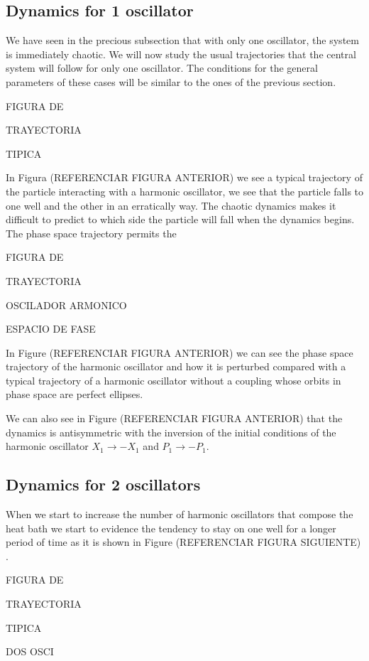 \subsection{Dynamics for 1 oscillator}
We have seen in the precious subsection that with only one oscillator, the system is immediately chaotic. We will now study the usual trajectories that the central system will follow for only one oscillator. The conditions for the general parameters of these cases will be similar to the ones of the previous section. 

FIGURA DE \par 
TRAYECTORIA \par 
TIPICA \par 

 In Figura (REFERENCIAR FIGURA ANTERIOR) we see a typical trajectory of the particle interacting with a harmonic oscillator, we see that the particle falls to one well and the other in an erratically way. The chaotic dynamics makes it difficult to predict to which side the particle will fall when the dynamics begins. The phase space trajectory permits the
 
 FIGURA DE \par 
TRAYECTORIA \par 
OSCILADOR ARMONICO \par 
ESPACIO DE FASE \par 

In Figure (REFERENCIAR FIGURA ANTERIOR) we can see the phase space trajectory of the harmonic oscillator and how it is perturbed compared with a typical trajectory of  a harmonic oscillator without a coupling whose orbits in phase space are perfect ellipses.\par 

We can also see in Figure (REFERENCIAR FIGURA ANTERIOR) that the dynamics is antisymmetric with the inversion of the initial conditions of the harmonic oscillator $X_1\rightarrow -X_1$ and $P_1 \rightarrow -P_1$.


\subsection{Dynamics for 2 oscillators}
When we start to increase the number of harmonic oscillators that compose the heat bath we start to evidence the tendency to stay on one well for a longer period of time as it is shown in Figure (REFERENCIAR FIGURA SIGUIENTE) .

FIGURA DE \par 
TRAYECTORIA \par 
TIPICA \par 
DOS OSCI \par 

